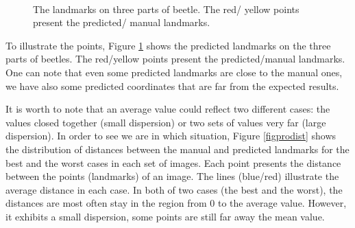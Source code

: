 \documentclass[review]{elsarticle}
\begin{document}
\begin{figure}[h!]
	\centering
    ~~
	~~
    \caption{The landmarks on three parts of beetle. The red/ yellow points present the predicted/ manual landmarks.}
    \label{figeb1}
\end{figure}

To illustrate the points, Figure \ref{figeb1} shows the predicted landmarks on the three parts of beetles. The red/yellow points present the predicted/manual landmarks. One can note that even some predicted landmarks are close to the manual ones, we have also some predicted coordinates that are far from the expected results.

It is worth to note that an average value could reflect two different cases: the values closed together (small dispersion) or two sets of values very far (large dispersion). In order to see we are in which situation, Figure \ref{figprodist} shows the distribution of distances between the manual and predicted landmarks for the best and the worst cases in each set of images. Each point presents the distance between the points (landmarks) of an image. The lines (blue/red) illustrate the average distance in each case. In both of two cases (the best and the worst), the distances are most often stay in the region from 0 to the average value. However, it exhibits a small dispersion, some points are still far away the mean value.
\end{document}
